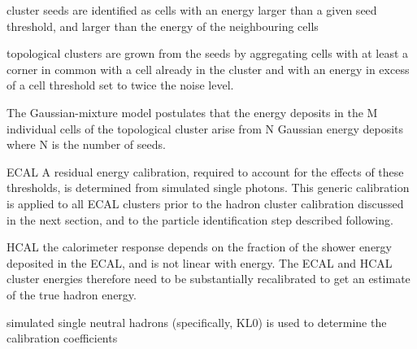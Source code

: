 cluster seeds are identified as cells with an energy larger than a given seed threshold, and larger than the energy of the neighbouring cells

topological clusters are grown from the seeds by aggregating cells with at least a corner in common with a cell already in the cluster and with an energy in excess of a cell threshold set to twice the noise level.

The Gaussian-mixture model postulates that the energy deposits in the M individual cells of the 
topological cluster arise from N Gaussian energy deposits where N is the number of seeds.


ECAL
A residual energy calibration, required to account for the effects of these thresholds, is determined from simulated single photons. This generic calibration is applied to all ECAL clusters prior to the hadron cluster calibration discussed in the next section, and to the particle identification step described following.

HCAL
the calorimeter response depends on the fraction of the shower energy deposited in the ECAL, and is not linear with energy. The ECAL and HCAL cluster energies therefore need to be substantially recalibrated to get an estimate of the true hadron energy.

simulated single neutral hadrons (specifically, KL0) is used to determine the calibration coefficients


